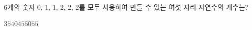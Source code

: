 $6$개의 숫자 $0$, $1$, $1$, $2$, $2$, $2$를 모두 사용하여 만들 수 있는 여섯 자리 자연수의 개수는?
\begin{choices32}{$35$}{$40$}{$45$}{$50$}{$55$}\end{choices32}
